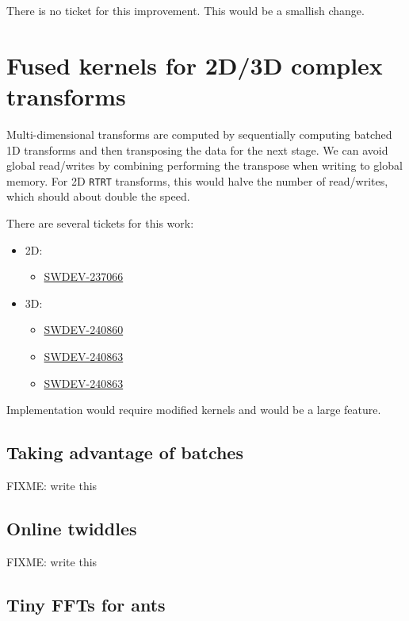 \documentclass[12pt]{article}
\renewcommand{\(}{\left(}
\renewcommand{\)}{\right)}
\begin{document}
There is no ticket for this improvement.  This would be a smallish
change.

\section{Fused kernels for 2D/3D complex transforms}

Multi-dimensional transforms are computed by sequentially computing
batched 1D transforms and then transposing the data for the next
stage.  We can avoid global read/writes by combining performing the
transpose when writing to global memory.  For 2D \texttt{RTRT}
transforms, this would halve the number of read/writes, which should
about double the speed.

There are several tickets for this work:
\begin{itemize}
\item 2D:
  \begin{itemize}
  \item \href{http://ontrack-internal.amd.com/browse/SWDEV-237066}{SWDEV-237066}
  \end{itemize}
\item 3D:
  \begin{itemize}
  \item \href{http://ontrack-internal.amd.com/browse/SWDEV-240860}{SWDEV-240860}
  \item \href{http://ontrack-internal.amd.com/browse/SWDEV-240863}{SWDEV-240863}
  \item \href{http://ontrack-internal.amd.com/browse/SWDEV-240864}{SWDEV-240863}
  \end{itemize}
\end{itemize}
Implementation would require modified kernels and would be a large
feature.

\subsection{Taking advantage of batches}

FIXME: write this

\subsection{Online twiddles}

FIXME: write this

\subsection{Tiny FFTs for ants}
\end{document}
